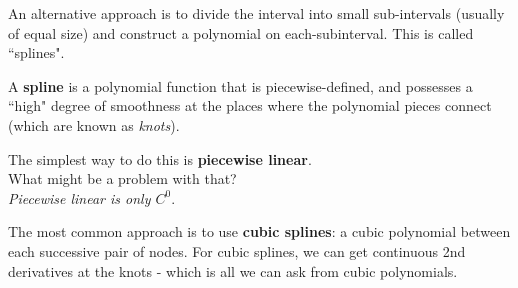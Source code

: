 \documentclass[12pt]{exam}
\begin{document}
An alternative approach is to divide the interval into small sub-intervals (usually of equal size) and construct a polynomial on each-subinterval. This is called ``splines".

%
%
%
%
%
\ifprintanswers
A \textbf{spline} is a polynomial function that is piecewise-defined, and possesses a ``high" degree of smoothness at the places where the polynomial pieces connect (which are known as \textit{knots}).
\else
\vspace*{3em}
\fi

The simplest way to do this is \textbf{piecewise linear}.\\ What might be a problem with that?\\ \textit{Piecewise linear is only $C^0$}.

The most common approach is to use \textbf{cubic splines}: a cubic polynomial between each successive pair of nodes. For cubic splines, we can get continuous 2nd derivatives at the knots - which is all we can ask from cubic polynomials. 
\end{document}
